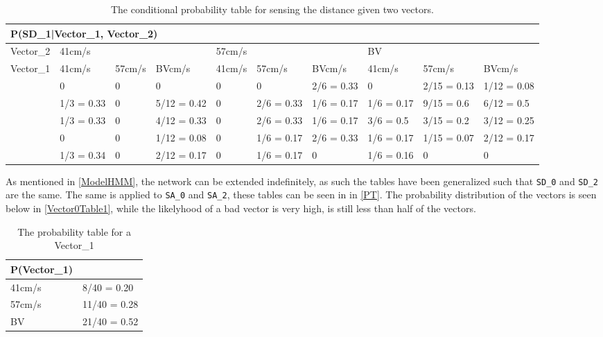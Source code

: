 \begin{table}[H]
\centering
\begin{tabular}{|l|p{1.2cm}|p{1.2cm}|l|p{1.2cm}|p{1.2cm}|p{1.2cm}|l|p{1.2cm}|p{1.2cm}|}
\hline
\multicolumn{10}{|l|}{P(SD\_1|Vector\_1, Vector\_2)} \\\hline
Vector\_2 & \multicolumn{3}{l|}{41cm/s} & \multicolumn{3}{l|}{57cm/s} &
\multicolumn{3}{l|}{BV}\\\hline
Vector\_1 & 41cm/s      &  57cm/s     & BVcm/s      & 41cm/s      & 57cm/s     
& BVcm/s & 41cm/s & 57cm/s & BVcm/s \\\hline
[0-60]& 0 & 0 & 0 & 0 & 0 & 2/6 = 0.33& 0 & 2/15 = 0.13 & 1/12 = 0.08 \\\hline
[60-75]& 1/3 = 0.33 & 0 & 5/12 = 0.42 & 0 & 2/6 = 0.33 & 1/6 = 0.17 & 1/6 = 0.17
& 9/15 = 0.6 & 6/12 = 0.5\\ \hline
[75-90] & 1/3 = 0.33 & 0 & 4/12 = 0.33 & 0 & 2/6 = 0.33 & 1/6 = 0.17 & 3/6 =
0.5 & 3/15 = 0.2 &3/12 = 0.25\\\hline
[90-105] & 0 & 0 & 1/12 = 0.08 & 0 & 1/6 = 0.17 & 2/6 = 0.33 & 1/6 = 0.17
& 1/15 = 0.07 & 2/12 = 0.17\\\hline
[105-255] & 1/3 = 0.34 & 0 & 2/12 = 0.17& 0 & 1/6 = 0.17 & 0 & 1/6 = 0.16 & 0
&0\\\hline
\end{tabular}
\caption{The conditional probability table for sensing the distance given two
vectors.}
\label{SDtable21}
\end{table}

As mentioned in \autoref{ModelHMM}, the network can be extended indefinitely,
as such the tables have been generalized such that \texttt{SD\_0} and
\texttt{SD\_2} are the same. The same is applied to \texttt{SA\_0} and
\texttt{SA\_2}, these tables can be seen in in \autoref{PT}. The probability
distribution of the vectors is seen below in \autoref{Vector0Table1}, while the
likelyhood of a bad vector is very high, is still less than half of the vectors.

\begin{table}[H]
\centering
\begin{tabular}{|l|l|}
\hline
P(Vector\_1) &\\ \hline
41cm/s & 8/40 = 0.20   \\ \hline 
57cm/s & 11/40 = 0.28  \\ \hline
BV & 21/40 = 0.52  \\ \hline
\end{tabular}
\caption{The probability table for a Vector\_1}
\label{Vector0Table1}
\end{table}


